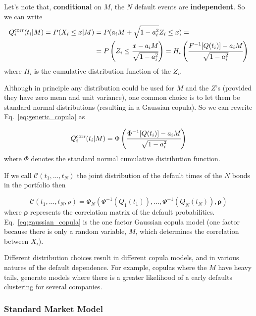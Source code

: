 Let's note that, \textbf{conditional} on $M$, the $N$ default events are \textbf{independent}. So we can write
\begin{equation}
\begin{split}
Q_i^{\textrm{corr}}(t_i|M) = P(X_i\le x|M) &= P(a_i M + \sqrt{1-a_i^2}Z_i\le x) =\\
&= P\left(Z_i\le \cfrac{x-a_i M}{\sqrt{1-a_i^2}}\right)
=H_i\left(\cfrac{F^{-1}[Q(t_i)]-a_i M}{\sqrt{1-a_i^2}}\right)
\end{split}
\label{eq:generic_copula}
\end{equation}
where $H_i$ is the cumulative distribution function of the $Z_i$.

Although in principle any distribution could be used for $M$ and the $Z$'s (provided they have zero mean and unit variance), one common choice is to let them be standard normal distributions (resulting in a Gaussian copula).
So we can rewrite Eq.~\ref{eq:generic_copula} as

\begin{equation}
Q_i^{\textrm{corr}}(t_i|M) = \Phi\left(\cfrac{\Phi^{-1}[Q(t_i)]-a_i M}{\sqrt{1-a_i^2}}\right)
\label{eq:gaussian_one_factor_copula}
\end{equation}
where $\Phi$ denotes the standard normal cumulative distribution function.

If we call $\mathcal{C}(t_1,\ldots,t_N)$ the joint distribution of the default times of the $N$ bonds in the portfolio then

\begin{equation}
\mathcal{C}(t_1,\ldots,t_N, \rho)=\Phi_{N}(\Phi^{-1}(Q_1(t_1)),\ldots,\Phi^{-1}(Q_N(t_N)), \boldsymbol{\rho})
\label{eq:gaussian_copula}
\end{equation}
where $\boldsymbol{\rho}$ represents the correlation matrix of the default probabilities. Eq.~\ref{eq:gaussian_copula} is the one factor Gaussian copula model (one factor because there is only a random variable, $M$, which determines the correlation between $X_i$).

Different distribution choices result in different copula models, and in various natures of the default dependence. For example, copulas where the $M$ have heavy tails, generate models where there is a greater likelihood of a early defaults clustering for several companies.

\subsubsection{Standard Market Model}
\label{standard-market-model}

